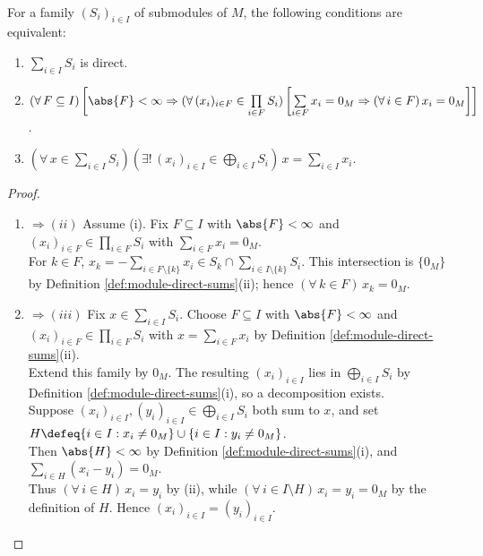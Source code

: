 \begin{proposition} \label{prop:module-direct-sum-characterizations} \\
For a family $(S_i)_{i\in I}$ of submodules of $M$, the following conditions are equivalent:
\begin{enumerate}[label=(\roman*)]
\setlength{\itemsep}{0pt}
\item $\sum\limits_{i\in I}S_i$ is direct.
\item $(\forall\,F\subseteq I)\left[\abs{F}<\infty\Rightarrow(\forall\,(x_i)_{i\in F}\in\prod\limits_{i\in F}S_i)\left[\sum\limits_{i\in F}x_i=0_M\Rightarrow(\forall\,i\in F)\,x_i=0_M\right]\right]$.
\item $(\forall\,x\in\sum\limits_{i\in I}S_i)(\exists!\,(x_i)_{i\in I}\in\bigoplus\limits_{i\in I}S_i)\,x=\sum\limits_{i\in I}x_i$.
\end{enumerate}
\begin{proof}
\begin{enumerate}[label=(\roman*)]
\setlength{\itemsep}{0pt}
\item[$(i)$] $\Rightarrow (ii)$ Assume (i). Fix $F\subseteq I$ with $\abs{F}<\infty$ and $(x_i)_{i\in F}\in\prod\limits_{i\in F}S_i$ with $\sum\limits_{i\in F}x_i=0_M$.\\
For $k\in F$, $x_k=-\sum\limits_{i\in F\setminus\{k\}}x_i\in S_k\cap\sum\limits_{i\in I\setminus\{k\}}S_i$. This intersection is $\{0_M\}$ by Definition \ref{def:module-direct-sums}(ii); hence $(\forall\,k\in F)\,x_k=0_M$.
\item[$(ii)$] $\Rightarrow (iii)$ Fix $x\in\sum\limits_{i\in I}S_i$. Choose $F\subseteq I$ with $\abs{F}<\infty$ and $(x_i)_{i\in F}\in\prod\limits_{i\in F}S_i$ with $x=\sum\limits_{i\in F}x_i$ by Definition \ref{def:module-direct-sums}(ii).\\
Extend this family by $0_M$. The resulting $(x_i)_{i\in I}$ lies in $\bigoplus\limits_{i\in I}S_i$ by Definition \ref{def:module-direct-sums}(i), so a decomposition exists.\\
Suppose $(x_i)_{i\in I},(y_i)_{i\in I}\in\bigoplus\limits_{i\in I}S_i$ both sum to $x$, and set $H\defeq\{i\in I:x_i\neq0_M\}\cup\{i\in I:y_i\neq0_M\}$.\\
Then $\abs{H}<\infty$ by Definition \ref{def:module-direct-sums}(i), and $\sum\limits_{i\in H}(x_i-y_i)=0_M$.\\
Thus $(\forall\,i\in H)\,x_i=y_i$ by (ii), while $(\forall\,i\in I\setminus H)\,x_i=y_i=0_M$ by the definition of $H$. Hence $(x_i)_{i\in I}=(y_i)_{i\in I}$.

\end{enumerate}
\end{proof}
\end{proposition}
